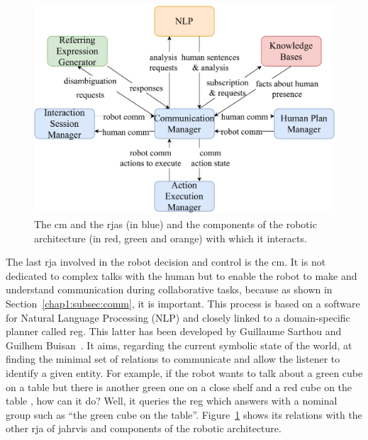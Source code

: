 \documentclass[a4paper,11pt,twoside]{StyleThese}
\begin{document}
\begin{figure}[!hbt]
	\centering
	\includegraphics[width=0.85\linewidth]{figures/chapter2/comm_manager_zoom.pdf}
	\caption{The \acrlong{cm} and the \acrshort{rja}s (in blue) and the components of the robotic architecture (in red, green and orange) with which it interacts.}
	\label{chap6:fig:comm_manager_zoom}
\end{figure}

The last \acrshort{rja} involved in the robot decision and control is the \acrfull{cm}. It is not dedicated to complex talks with the human but to enable the robot to make and understand communication during collaborative tasks, because as shown in Section~\ref{chap1:subsec:comm}, it is important. This process is based on a software for Natural Language Processing (NLP) and closely linked to a domain-specific planner called \acrfull{reg}. This latter has been developed by Guillaume Sarthou and Guilhem Buisan~\cite{buisan_2020_efficient}. It aims, regarding the current symbolic state of the world, at finding the minimal set of relations to communicate and allow the listener to identify a given entity. For example, if the robot wants to talk about a green cube on a table but there is another green one on a close shelf and a red cube on the table , how can it do? Well, it queries the \acrshort{reg} which answers with a nominal group such as ``the green cube on the table''. Figure~\ref{chap6:fig:comm_manager_zoom} shows its relations with the other \acrshort{rja} of \acrshort{jahrvis} and components of the robotic architecture.
\end{document}
